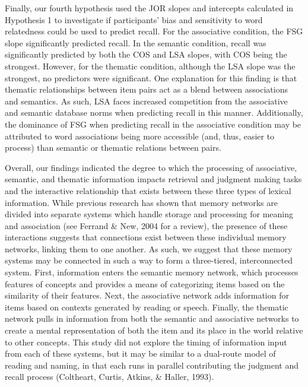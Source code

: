 \documentclass[english,man]{apa6}
\theoremstyle{definition}
\theoremstyle{definition}
\theoremstyle{definition}
\theoremstyle{remark}
\begin{document}
Finally, our fourth hypothesis used the JOR slopes and intercepts
calculated in Hypothesis 1 to investigate if participants' bias and
sensitivity to word relatedness could be used to predict recall. For the
associative condition, the FSG slope significantly predicted recall. In
the semantic condition, recall was significantly predicted by both the
COS and LSA slopes, with COS being the strongest. However, for the
thematic condition, although the LSA slope was the strongest, no
predictors were significant. One explanation for this finding is that
thematic relationships between item pairs act as a blend between
associations and semantics. As such, LSA faces increased competition
from the associative and semantic database norms when predicting recall
in this manner. Additionally, the dominance of FSG when predicting
recall in the associative condition may be attributed to word
associations being more accessible (and, thus, easier to process) than
semantic or thematic relations between pairs.

Overall, our findings indicated the degree to which the processing of
associative, semantic, and thematic information impacts retrieval and
judgment making tasks and the interactive relationship that exists
between these three types of lexical information. While previous
research has shown that memory networks are divided into separate
systems which handle storage and processing for meaning and association
(see Ferrand \& New, 2004 for a review), the presence of these
interactions suggests that connections exist between these individual
memory networks, linking them to one another. As such, we suggest that
these memory systems may be connected in such a way to form a
three-tiered, interconnected system. First, information enters the
semantic memory network, which processes features of concepts and
provides a means of categorizing items based on the similarity of their
features. Next, the associative network adds information for items based
on contexts generated by reading or speech. Finally, the thematic
network pulls in information from both the semantic and associative
networks to create a mental representation of both the item and its
place in the world relative to other concepts. This study did not
explore the timing of information input from each of these systems, but
it may be similar to a dual-route model of reading and naming, in that
each runs in parallel contributing the judgment and recall process
(Coltheart, Curtis, Atkins, \& Haller, 1993).
\end{document}
